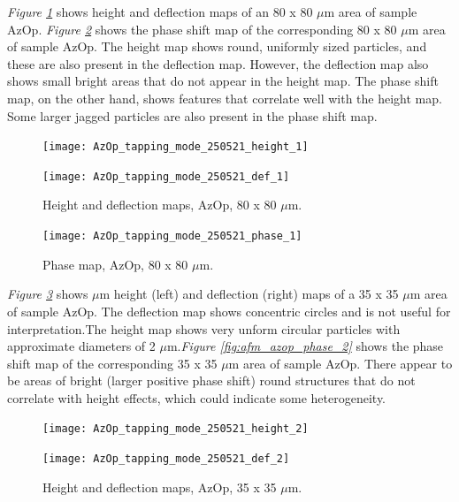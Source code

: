 
\textit{Figure \ref{fig:afm_azop_height_def_1}} shows height and deflection maps of an 80 x 80 $\mu$m area of sample AzOp. \textit{Figure \ref{fig:afm_azop_phase_1}} shows the phase shift map of the corresponding 80 x 80 $\mu$m area of sample AzOp. The height map shows round, uniformly sized particles, and these are also present in the deflection map. However, the deflection map also shows small bright areas that do not appear in the height map. The phase shift map, on the other hand, shows features that correlate well with the height map. Some larger jagged particles are also present in the phase shift map.

\begin{figure}[H]
\centering
\begin{minipage}{.45\textwidth}
  \centering
  \texttt{[image: AzOp\_tapping\_mode\_250521\_height\_1]}
\end{minipage}
\begin{minipage}{.45\textwidth}
  \centering
  \texttt{[image: AzOp\_tapping\_mode\_250521\_def\_1]}
\end{minipage}
\caption[Height and deflection maps, AzOp]{Height and deflection maps, AzOp, 80 x 80 $\mu$m.}
\label{fig:afm_azop_height_def_1}
\end{figure}

\begin{figure}[H]
\centering
  \texttt{[image: AzOp\_tapping\_mode\_250521\_phase\_1]}
\caption[Phase map, AzOp]{Phase map, AzOp, 80 x 80 $\mu$m.}
\label{fig:afm_azop_phase_1}
\end{figure}

\textit{Figure \ref{fig:afm_azop_height_def_2}} shows $\mu$m height (left) and deflection (right) maps of a 35 x 35 $\mu$m area of sample AzOp. The deflection map shows concentric circles and is not useful for interpretation.The height map shows very unform circular particles with approximate diameters of 2 $\mu$m.\textit{Figure \ref{fig:afm_azop_phase_2}} shows the phase shift map of the corresponding 35 x 35 $\mu$m area of sample AzOp. There appear to be areas of bright (larger positive phase shift) round structures that do not correlate with height effects, which could indicate some heterogeneity.

\begin{figure}[H]
\centering
\begin{minipage}{.45\textwidth}
  \centering
  \texttt{[image: AzOp\_tapping\_mode\_250521\_height\_2]}
\end{minipage}
\begin{minipage}{.45\textwidth}
  \centering
  \texttt{[image: AzOp\_tapping\_mode\_250521\_def\_2]}
\end{minipage}
\caption[Height and deflection maps, AzOp]{Height and deflection maps, AzOp, 35 x 35 $\mu$m.}
\label{fig:afm_azop_height_def_2}
\end{figure}

